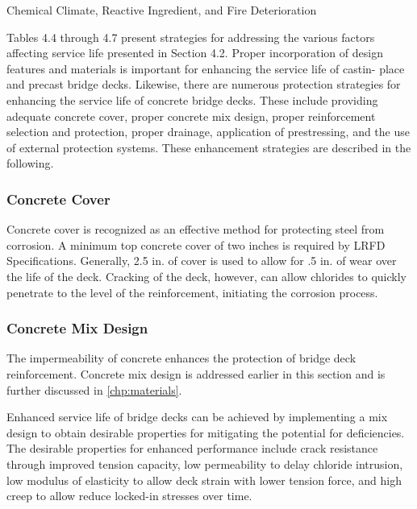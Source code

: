 \begin{table}
  \caption{Chemical Climate, Reactive Ingredient, and Fire Deterioration}
  \label{tab:chemical-climate-deterioration}
\end{table}

Tables 4.4 through 4.7 present strategies for addressing the various factors affecting service life presented in
Section 4.2. Proper incorporation of design features and materials is important for enhancing the service life of castin-
place and precast bridge decks. Likewise, there are numerous protection strategies for enhancing the service life of
concrete bridge decks. These include providing adequate concrete cover, proper concrete mix design, proper
reinforcement selection and protection, proper drainage, application of prestressing, and the use of external protection
systems. These enhancement strategies are described in the following.

\subsubsection{Concrete Cover}
Concrete cover is recognized as an effective method for protecting steel from corrosion. A minimum top concrete
cover of two inches is required by LRFD Specifications. Generally, 2.5 in. of cover is used to allow for .5 in. of wear over the life of the deck. Cracking of the deck, however, can allow chlorides to quickly penetrate to the level of the
reinforcement, initiating the corrosion process.

\subsubsection{Concrete Mix Design}
The impermeability of concrete enhances the protection of bridge deck reinforcement. Concrete mix design is
addressed earlier in this section and is further discussed in \cref{chp:materials}.

Enhanced service life of bridge decks can be achieved by implementing a mix design to obtain desirable
properties for mitigating the potential for deficiencies. The desirable properties for enhanced performance include
crack resistance through improved tension capacity, low permeability to delay chloride intrusion, low modulus of
elasticity to allow deck strain with lower tension force, and high creep to allow reduce locked-in stresses over time.

